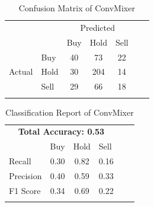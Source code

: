 \documentclass{article}
\begin{document}
\begin{table}[H]
    \centering
    \caption{Confusion Matrix of ConvMixer}
    \begin{tabular}{llcccll}
        \cline{1-5}
        \multicolumn{1}{|l|}{} & \multicolumn{1}{l|}{} & \multicolumn{3}{c|}{Predicted} & & \\\cline{1-5} \multicolumn{1}{|l|}{} & \multicolumn{1}{l|}{} & \multicolumn{1}{l|}{Buy} & \multicolumn{1}{l|}{Hold} & \multicolumn{1}{l|}{Sell} & & \\ \cline{1-5} \multicolumn{1}{|c|}{\multirow{3}{*}{Actual}} & \multicolumn{1}{l|}{Buy} & \multicolumn{1}{c|}{40} & \multicolumn{1}{c|}{73} & \multicolumn{1}{c|}{22} & & \\ \cline{2-5} \multicolumn{1}{|c|}{} & \multicolumn{1}{l|}{Hold} & \multicolumn{1}{c|}{30} & \multicolumn{1}{c|}{204}  & \multicolumn{1}{c|}{14}& & \\ \cline{2-5} \multicolumn{1}{|c|}{} & \multicolumn{1}{l|}{Sell} & \multicolumn{1}{c|}{29} & \multicolumn{1}{c|}{66} & \multicolumn{1}{c|}{18} & & \\ \cline{1-5} & & \multicolumn{1}{l}{} & \multicolumn{1}{l}{} & \multicolumn{1}{l}{} &&
    \end{tabular}
\end{table}
\begin{table}[H]
    \centering
    \caption{Classification Report of ConvMixer}
    \begin{tabular}{lcccll}
        \cline{1-4}
        \multicolumn{4}{|c|}{\textbf{Total Accuracy: 0.53}} & & \\\cline{1-4} \multicolumn{1}{|l|}{} & \multicolumn{1}{l|}{Buy} & \multicolumn{1}{l|}{Hold} & \multicolumn{1}{l|}{Sell} & & \\\cline{1-4} \multicolumn{1}{|l|}{Recall} & \multicolumn{1}{c|}{0.30} & \multicolumn{1}{c|}{0.82} & \multicolumn{1}{c|}{0.16} & & \\\cline{1-4} \multicolumn{1}{|l|}{Precision} & \multicolumn{1}{c|}{0.40} & \multicolumn{1}{c|}{0.59} & \multicolumn{1}{c|}{0.33} & &  \\\cline{1-4} \multicolumn{1}{|l|}{F1 Score} & \multicolumn{1}{c|}{0.34} & \multicolumn{1}{c|}{0.69} & \multicolumn{1}{c|}{0.22} & &  \\\cline{1-4} & \multicolumn{1}{l}{} & \multicolumn{1}{l}{} & \multicolumn{1}{l}{} & & 
    \end{tabular}
\end{table}
\end{document}
